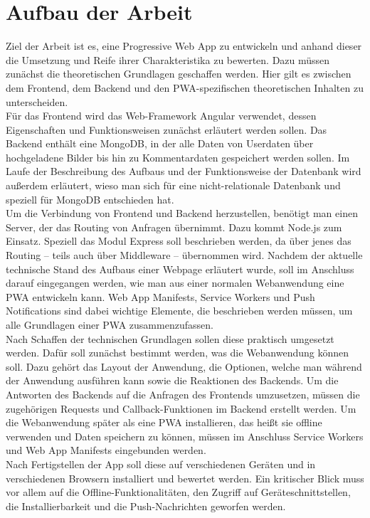 \section{Aufbau der Arbeit}\label{se:AufbauDerArbeit}
Ziel der Arbeit ist es, eine Progressive Web App zu entwickeln und anhand dieser die Umsetzung und Reife ihrer Charakteristika zu bewerten. 
Dazu müssen zunächst die theoretischen Grundlagen geschaffen werden. Hier gilt es zwischen dem Frontend, dem Backend und den PWA-spezifischen theoretischen Inhalten zu unterscheiden.\\
Für das Frontend wird das Web-Framework Angular verwendet, dessen Eigenschaften und Funktionsweisen zunächst erläutert werden sollen. Das Backend enthält eine MongoDB, in der alle Daten von Userdaten über hochgeladene Bilder bis hin zu Kommentardaten gespeichert werden sollen. Im Laufe der Beschreibung des Aufbaus und der Funktionsweise der Datenbank wird außerdem erläutert, wieso man sich für eine nicht-relationale Datenbank und speziell für MongoDB entschieden hat.\\
Um die Verbindung von Frontend und Backend herzustellen, benötigt man einen Server, der das Routing von Anfragen übernimmt. Dazu kommt Node.js zum Einsatz. Speziell das Modul Express soll beschrieben werden, da über jenes das Routing – teils auch über Middleware – übernommen wird.
Nachdem der aktuelle technische Stand des Aufbaus einer Webpage erläutert wurde, soll im Anschluss darauf eingegangen werden, wie man aus einer normalen Webanwendung eine PWA entwickeln kann. Web App Manifests, Service Workers und Push Notifications sind dabei wichtige Elemente, die beschrieben werden müssen, um alle Grundlagen einer PWA zusammenzufassen. \\
Nach Schaffen der technischen Grundlagen sollen diese praktisch umgesetzt werden. Dafür soll zunächst bestimmt werden, was die Webanwendung können soll. Dazu gehört das Layout der Anwendung, die Optionen, welche man während der Anwendung ausführen kann sowie die Reaktionen des Backends. Um die Antworten des Backends auf die Anfragen des Frontends umzusetzen, müssen die zugehörigen Requests und Callback-Funktionen im Backend erstellt werden. Um die Webanwendung später als eine PWA installieren, das heißt sie offline verwenden und Daten speichern zu können, müssen im Anschluss Service Workers und Web App Manifests eingebunden werden.\\
Nach Fertigstellen der App soll diese auf verschiedenen Geräten und in verschiedenen Browsern installiert und bewertet werden. Ein kritischer Blick muss vor allem auf die Offline-Funktionalitäten, den Zugriff auf Geräteschnittstellen, die Installierbarkeit und die Push-Nachrichten geworfen werden. 
